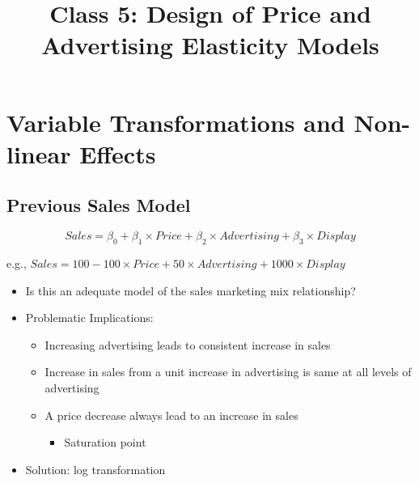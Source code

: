 \documentclass[10pt,article]{article}
\date{\vspace{-6ex}}
\title{Class 5: Design of Price and Advertising Elasticity Models}
\begin{document}
\maketitle
{} 
\thispagestyle{fancy}

\setcounter{tocdepth}{1}
\tableofcontents
\vspace{6ex}

\section{Variable Transformations and Non-linear Effects}
\label{sec:orgf26ce2b}
\subsection{Previous Sales Model}
\label{sec:org230afc3}
\[ Sales = \beta_0 + \beta_1 \times Price + \beta_2 \times Advertising +
           \beta_3 \times Display \]

e.g., \(Sales = 100 -100 \times Price + 50 \times Advertising +
           1000 \times Display\)
\begin{itemize}
\item Is this an adequate model of the sales marketing mix relationship?
\end{itemize}

\iffalse
\[ Sales = \beta_0 + \beta_1 \times Price + \beta_2 \times Advertising +
           \beta_3 \times Display \]
\fi

\begin{itemize}
\item Problematic Implications: 
\begin{itemize}
\item Increasing advertising leads to consistent increase in sales
\item Increase in sales from a unit increase in advertising is same at all
levels of advertising
\item A price decrease always lead to an increase in sales
\begin{itemize}
\item Saturation point
\end{itemize}
\end{itemize}
\end{itemize}

\begin{itemize}
\item Solution: log transformation
\end{itemize}
\end{document}
